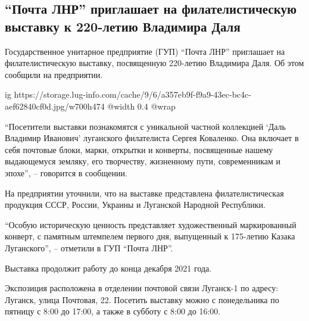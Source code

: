  
 
 
 
 
\subsection{\enquote{Почта ЛНР} приглашает на филателистическую выставку к 220-летию Владимира Даля}
\label{sec:07_12_2021.stz.news.lnr.lug_info.1.vystavka_filatelia}


Государственное унитарное предприятие (ГУП) \enquote{Почта ЛНР} приглашает на
филателистическую выставку, посвященную 220-летию Владимира Даля. Об этом
сообщили на предприятии.

\ifcmt
  ig https://storage.lug-info.com/cache/9/6/a357eb9f-f9a9-43ec-bc4c-aef62840cf0d.jpg/w700h474
  @width 0.4
  @wrap 
\fi

\enquote{Посетители выставки познакомятся с уникальной частной коллекцией
\enquote{Даль Владимир Иванович} луганского филателиста Сергея Коваленко. Она
включает в себя почтовые блоки, марки, открытки и конверты, посвященные нашему
выдающемуся земляку, его творчеству, жизненному пути, современникам и эпохе}, –
говорится в сообщении.

На предприятии уточнили, что на выставке представлена филателистическая
продукция СССР, России, Украины и Луганской Народной Республики.

\enquote{Особую историческую ценность представляет художественный маркированный
конверт, с памятным штемпелем первого дня, выпущенный к 175-летию Казака
Луганского}, – отметили в ГУП \enquote{Почта ЛНР}.

Выставка продолжит работу до конца декабря 2021 года.

Экспозиция расположена в отделении почтовой связи Луганск-1 по адресу: Луганск,
улица Почтовая, 22. Посетить выставку можно с понедельника по пятницу с 8:00 до
17:00, а также в субботу с 8:00 до 16:00.

